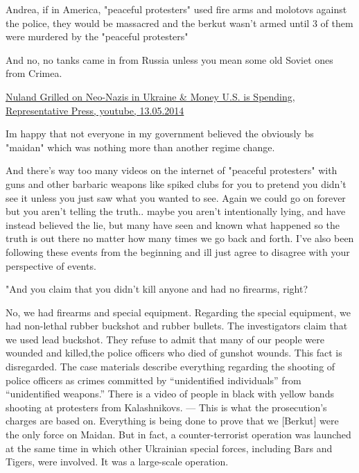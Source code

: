 \begin{itemize}
\begin{itemize}

Andrea, if in America, "peaceful protesters" used fire arms and molotovs
against the police, they would be massacred and the berkut wasn't armed until 3
of them were murdered by the "peaceful protesters"

And no, no tanks came in from Russia unless you mean some old Soviet ones from
Crimea.


\href{http://m.youtube.com/watch?v=6TpZa4OMFVk}{%
Nuland Grilled on Neo-Nazis in Ukraine \& Money U.S. is Spending, %
Representative Press, youtube, 13.05.2014%
}

Im happy that not everyone in my government believed the obviously bs "maidan"
which was nothing more than another regime change.


And there's way too many videos on the internet of "peaceful protesters" with
guns and other barbaric weapons like spiked clubs for you to pretend you didn't
see it unless you just saw what you wanted to see. Again we could go on forever
but you aren't telling the truth.. maybe you aren't intentionally lying, and
have instead believed the lie, but many have seen and known what happened so
the truth is out there no matter how many times we go back and forth. I've also
been following these events from the beginning and ill just agree to disagree
with your perspective of events.


"And you claim that you didn’t kill anyone and had no firearms, right?

No, we had firearms and special equipment. Regarding the special equipment, we
had non-lethal rubber buckshot and rubber bullets. The investigators claim that
we used lead buckshot. They refuse to admit that many of our people were
wounded and killed,the police officers who died of gunshot wounds. This fact is
disregarded. The case materials describe everything regarding the shooting of
police officers as crimes committed by \enquote{unidentified individuals} from
\enquote{unidentified weapons.} There is a video of people in black with yellow bands
shooting at protesters from Kalashnikovs. — This is what the prosecution’s
charges are based on. Everything is being done to prove that we [Berkut] were
the only force on Maidan. But in fact, a counter-terrorist operation was
launched at the same time in which other Ukrainian special forces, including
Bars and Tigers, were involved. It was a large-scale operation.


\end{itemize}
\end{itemize}
